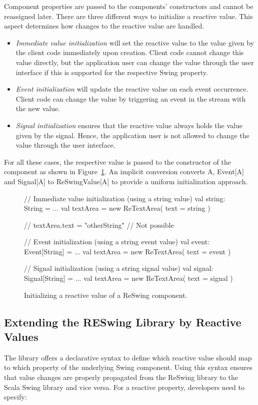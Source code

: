 \documentclass{scrartcl}
\newcommand{\code}[1]{{\fontfamily{cmtt}\small\selectfont#1}}
\begin{document}
Component properties are passed to the components' constructors and
cannot be reassigned later. There are three different ways to
initialize a reactive value. This aspect determines how changes to the
reactive value are handled.

\begin{itemize}
\item \emph{Immediate value initialization} will set the reactive
value to the value given by the client code immediately upon creation.
Client code cannot change this value directly, but the application
user can change the value through the user interface if this is
supported for the respective Swing property.
\item \emph{Event initialization} will update the reactive value on
each event occurrence. Client code can change the value by triggering
an event in the stream with the new value.
\item \emph{Signal initialization} ensures that the reactive value
always holds the value given by the signal. Hence, the application
user is not allowed to change the value through the user interface.
\end{itemize}

For all these cases, the respective value is passed to the constructor
of the component as shown in
Figure~\ref{lst:initializing-reactive-values}. An implicit conversion
converts \code{A}, \code{Event[A]} and \code{Signal[A]} to
\code{ReSwingValue[A]} to provide a uniform initialization approach.

\begin{figure}[htp]
\begin{codenv}
// Immediate value initialization (using a string value)
val string: String = ...
val textArea = new ReTextArea(
    text = string 
)

// textArea.text = "otherString" // Not possible 

// Event initialization (using a string event value)
val event: Event[String] = ...
val textArea = new ReTextArea(
    text = event
)

// Signal initialization (using a string signal value)
val signal: Signal[String] = ...
val textArea = new ReTextArea( 
    text = signal 
)
\end{codenv}
\caption{Initializing a reactive value of a ReSwing component.}
\label{lst:initializing-reactive-values}
\end{figure}

\subsection{Extending the RESwing Library by Reactive Values}
\label{sec:defining-reactive-values}
The library offers a declarative syntax to define which reactive value
should map to which property of the underlying Swing component. Using
this syntax ensures that value changes are properly propagated from
the ReSwing library to the Scala Swing library and vice versa. For a
reactive property, developers need to specify:
\end{document}
